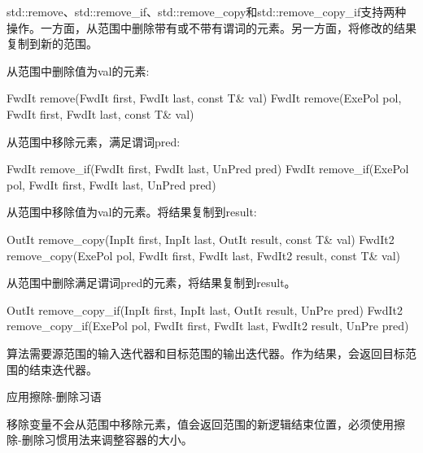 
std::remove、std::remove\_if、std::remove\_copy和std::remove\_copy\_if支持两种操作。一方面，从范围中删除带有或不带有谓词的元素。另一方面，将修改的结果复制到新的范围。

从范围中删除值为val的元素:

\begin{cpp}
FwdIt remove(FwdIt first, FwdIt last, const T& val)
FwdIt remove(ExePol pol, FwdIt first, FwdIt last, const T& val)
\end{cpp}

从范围中移除元素，满足谓词pred:

\begin{cpp}
FwdIt remove_if(FwdIt first, FwdIt last, UnPred pred)
FwdIt remove_if(ExePol pol, FwdIt first, FwdIt last, UnPred pred)
\end{cpp}

从范围中移除值为val的元素。将结果复制到result:

\begin{cpp}
OutIt remove_copy(InpIt first, InpIt last, OutIt result, const T& val)
FwdIt2 remove_copy(ExePol pol, FwdIt first, FwdIt last,
					FwdIt2 result, const T& val)
\end{cpp}

从范围中删除满足谓词pred的元素，将结果复制到result。

\begin{cpp}
OutIt remove_copy_if(InpIt first, InpIt last, OutIt result, UnPre pred)
FwdIt2 remove_copy_if(ExePol pol, FwdIt first, FwdIt last,
						FwdIt2 result, UnPre pred)
\end{cpp}

算法需要源范围的输入迭代器和目标范围的输出迭代器。作为结果，会返回目标范围的结束迭代器。

\begin{myWarning}{应用擦除-删除习语}
	
移除变量不会从范围中移除元素，值会返回范围的新逻辑结束位置，必须使用擦除-删除习惯用法来调整容器的大小。


\end{myWarning}

